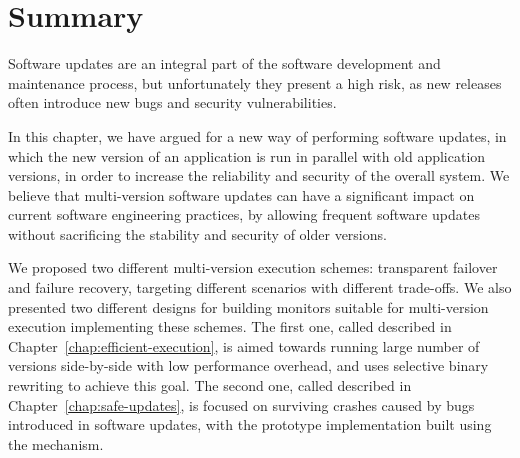 \section{Summary}
\label{multi-version:summary}

Software updates are an integral part of the software development and
maintenance process, but unfortunately they present a high risk, as new
releases often introduce new bugs and security vulnerabilities.

In this chapter, we have argued for a new way of performing software updates,
in which the new version of an application is run in parallel with old
application versions, in order to increase the reliability and security of the
overall system. We believe that multi-version software updates can have a
significant impact on current software engineering practices, by allowing
frequent software updates without sacrificing the stability and security of
older versions.

We proposed two different multi-version execution schemes: transparent failover
and failure recovery, targeting different scenarios with different trade-offs.
We also presented two different designs for building monitors suitable for
multi-version execution implementing these schemes. The first one, called
\varan described in Chapter~\ref{chap:efficient-execution}, is aimed towards
running large number of versions side-by-side with low performance overhead,
and uses selective binary rewriting to achieve this goal. The second one,
called \mx described in Chapter~\ref{chap:safe-updates}, is focused on
surviving crashes caused by bugs introduced in software updates, with the
prototype implementation built using the \ptrace mechanism.
